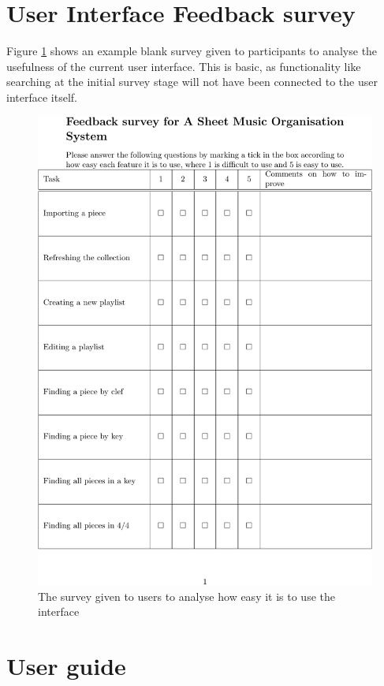 \begin{appendices}
\section{User Interface Feedback survey}
Figure \ref{fig:survey} shows an example blank survey given to participants to analyse the usefulness of the current user interface. This is basic, as functionality like searching at the initial survey stage will not have been connected to the user interface itself.
\begin{figure}[H]
\centering
\includegraphics{survey-crop.pdf}	
\caption{The survey given to users to analyse how easy it is to use the interface}
\label{fig:survey}
\end{figure}
\section{User guide}


\end{appendices}
